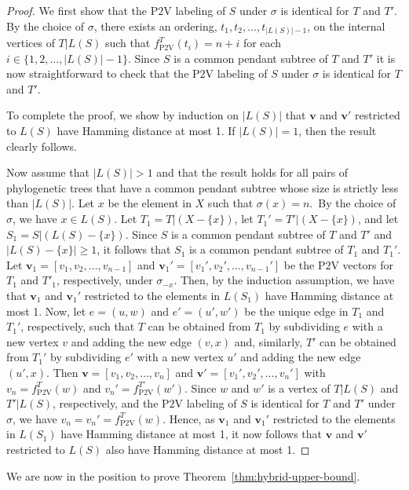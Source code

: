 \documentclass{article}
\newcommand{\PV}{\mathrm{P2V}}
\begin{document}
\begin{proof}
We first show that the $\PV$  labeling of $S$ under $\sigma$ is identical for $T$ and $T'$. By the choice of $\sigma$, there exists an ordering, $t_1,t_2,\ldots,t_{|L(S)|-1}$, on the internal vertices of $T|{L(S)}$ such that $f_\PV^T(t_i)=n+i$ for each $i\in\{1,2,\ldots, |L(S)|-1\}$.  Since $S$ is a common pendant subtree of $T$ and $T'$ it is now straightforward to check that the $\PV$  labeling of $S$ under $\sigma$ is identical for $T$ and $T'$. 

To complete the proof, we show by induction on $|L(S)|$ that $\mathbf{v}$ and $\mathbf{v}'$ restricted to  $L(S)$ have Hamming distance at most 1.
If $|L(S)|=1$, then the result clearly follows. 

Now assume that $|L(S)|>1$ and that the result holds for all pairs of phylogenetic trees that have a common pendant subtree whose size is strictly less than $|L(S)|$. Let $x$ be the element in $X$ such that $\sigma(x)=n$.\ By the choice of $\sigma$, we have 
$x\in L(S)$.
Let $T_1=T|(X- \{x\})$, let $T_1'=T'|(X- \{x\})$, and let $S_1=S|(L(S)- \{x\})$. Since $S$ is a common pendant subtree of $T$ and $T'$ and $|L(S)-\{x\}|\ge 1$, it follows that $S_1$ is a common pendant subtree of $T_1$ and $T_1'$.  Let $\mathbf{v}_1=[v_1,v_2,\ldots,v_{n-1}]$ and $\mathbf{v}_1'=[v_1',v_2',\ldots,v_{n-1}']$  be the $\PV$ vectors for  $T_1$ and $T'_1$, respectively, under $\sigma_{-x}$.  Then, by the induction assumption, we have that $\mathbf{v}_1$ and $\mathbf{v}_1'$ restricted to the elements in $L(S_1)$ have Hamming distance at most 1. Now, let $e=(u,w)$ and $e'=(u',w')$ be the unique edge in $T_1$ and $T_1'$, respectively, such that $T$ can be obtained from $T_1$ by subdividing $e$ with a new vertex $v$ and adding the new edge $(v,x)$ and, similarly, $T'$ can be obtained from $T_1'$ by subdividing $e'$ with a new vertex $u'$ and adding the new edge $(u',x)$. Then $\mathbf{v}=[v_1,v_2,\ldots,v_n]$ and $\mathbf{v}'=[v_1',v_2',\ldots,v_n']$ with $v_n=f^{T}_\PV(w)$ and $v_n'=f^{T'}_\PV(w')$. Since $w$ and $w'$ is a vertex of $T|L(S)$ and $T'|{L(S)}$, respectively, and  the $\PV$ labeling of $S$ is identical for $T$ and $T'$ under $\sigma$, we have  $v_n=v_n'=f_\PV^{T}(w)$. Hence, as $\mathbf{v}_1$ and $\mathbf{v}_1'$ restricted to the elements in $L(S_1)$ have Hamming distance at most 1, it now follows that $\mathbf{v}$ and $\mathbf{v}'$ restricted to $L(S)$ also have Hamming distance at most 1. \end{proof}


We are now in the position to prove Theorem~\ref{thm:hybrid-upper-bound}.
\end{document}
